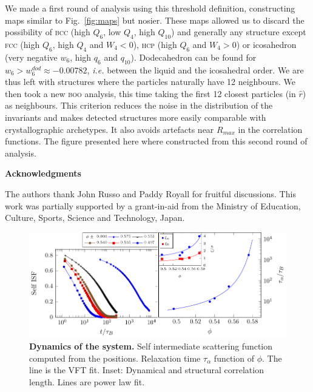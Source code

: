 We made a first round of analysis using this threshold definition, constructing maps similar to Fig.~\ref{fig:maps} but nosier. These maps allowed us to discard the possibility of \textsc{bcc} (high $Q_6$, low $Q_4$, high $Q_{10}$) and generally any structure except \textsc{fcc} (high $Q_6$, high $Q_4$ and $W_4<0$), \textsc{hcp} (high $Q_6$ and $W_4>0$) or icosahedron (very negative $w_6$, high $q_6$ and $q_{10}$). Dodecahedron can be found for $w_6>w_6^{dod}\approx -0.00782$, \emph{i.e.} between the liquid and the icosahedral order. We are thus left with structures where the particles naturally have 12 neighbours. We then took a new \textsc{boo} analysis, this time taking the first 12 closest particles (in $\hat{r}$) as neighbours. This criterion reduces the noise in the distribution of the invariants and makes detected structures more easily comparable with crystallographic archetypes. It also avoids artefacts near $R_{max}$ in the correlation functions. The figure presented here where constructed from this second round of analysis.


%


\vspace{2cm}
\noindent
\textbf{Acknowledgments}

\noindent
The authors thank John Russo and Paddy Royall for fruitful discussions. 
This work was partially supported by a grant-in-aid from the 
Ministry of Education, Culture, Sports, Science and Technology, Japan. 

\clearpage

\begin{figure}
\begin{center}
\includegraphics{generate_figures-figure0.pdf}
\end{center}
\caption{\textbf{Dynamics of the system.} Self intermediate scattering function computed from the positions. Relaxation time $\tau_\alpha$ function of $\phi$. The line is the VFT fit. Inset: Dynamical and structural correlation length. Lines are power law fit.}
	\label{fig:vft}
\end{figure}


